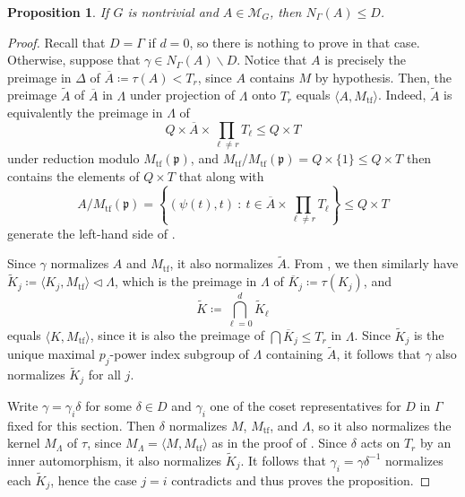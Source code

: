 \documentclass[11pt]{article}
\theoremstyle{plain}
\newtheorem{prop}[thm]{Proposition}
\theoremstyle{definition}
\theoremstyle{remark}
\newcommand{\calM}{\mathcal{M}}
\newcommand{\frakp}{\mathfrak{p}}
\newcommand{\gam}{\gamma}
\newcommand{\Gam}{\Gamma}
\newcommand{\de}{\delta}
\newcommand{\Del}{\Delta}
\newcommand{\Lam}{\Lambda}
\newcommand{\ssm}{\smallsetminus}
\newcommand{\conj}{\overline}
\newcommand{\wt}{\widetilde}
\newenvironment{pf}{\begin{proof}}{\end{proof}}
\begin{document}
\begin{prop}\label{prop:NormInD}
If $G$ is nontrivial and $A \in \calM_G$, then $N_\Gam(A) \le D$.
\end{prop}
\begin{pf}
Recall that $D = \Gam$ if $d = 0$, so there is nothing to prove in that case. Otherwise, suppose that $\gam \in N_\Gam(A) \ssm D$. Notice that $A$ is precisely the preimage in $\Del$ of $\conj{A} \coloneqq \tau(A) < T_r$, since $A$ contains $M$ by hypothesis. Then, the preimage $\wt{A}$ of $\conj{A}$ in $\Lam$ under projection of $\Lam$ onto $T_r$ equals $\langle A, M_\mathrm{tf} \rangle$. Indeed, $\wt{A}$ is equivalently the preimage in $\Lam$ of
\begin{equation}\label{eq:wtADef}
Q \times \conj{A} \times \prod_{\ell \neq r} T_\ell \le Q \times T
\end{equation}
under reduction modulo $M_\mathrm{tf}(\frakp)$, and $M_\mathrm{tf} / M_\mathrm{tf}(\frakp) = Q \times \{1\} \le Q \times T$ then contains the elements of $Q \times T$ that along with
\begin{equation}\label{eq:ImageOfA}
A / M_\mathrm{tf}(\frakp) =\! \left\{(\psi(t), t)\ :\ t \in \conj{A} \times \prod_{\ell \neq r} T_\ell \right\}\! \le Q \times T
\end{equation}
generate the left-hand side of .

Since $\gam$ normalizes $A$ and $M_\mathrm{tf}$, it also normalizes $\wt{A}$. From , we then similarly have $\wt{K}_j \coloneqq \langle K_j, M_\mathrm{tf} \rangle \triangleleft \Lam$, which is the preimage in $\Lam$ of $\conj{K}_j \coloneqq \tau(K_j)$, and
\begin{equation}\label{eq:wtKDef}
\wt{K} \coloneqq \bigcap_{\ell = 0}^d \wt{K}_\ell
\end{equation}
equals $\langle K, M_\mathrm{tf} \rangle$, since it is also the preimage of $\bigcap \conj{K}_j \le T_r$ in $\Lam$. Since $\wt{K}_j$ is the unique maximal $p_j$-power index subgroup of $\Lam$ containing $\wt{A}$, it follows that $\gam$ also normalizes $\wt{K}_j$ for all $j$.

Write $\gam = \gam_i \de$ for some $\de \in D$ and $\gam_i$ one of the coset representatives for $D$ in $\Gam$ fixed for this section. Then $\de$ normalizes $M$, $M_\mathrm{tf}$, and $\Lam$, so it also normalizes the kernel $M_\Lam$ of $\tau$, since $M_\Lam = \langle M, M_\mathrm{tf}\rangle$ as in the proof of . Since $\de$ acts on $T_r$ by an inner automorphism, it also normalizes $\wt{K}_j$. It follows that $\gam_i = \gam \de^{-1}$ normalizes each $\wt{K}_j$, hence the case $j = i$ contradicts  and thus proves the proposition.
\end{pf}
\end{document}
